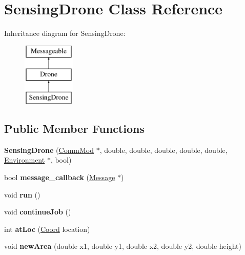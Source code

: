\hypertarget{class_sensing_drone}{}\section{Sensing\+Drone Class Reference}
\label{class_sensing_drone}
Inheritance diagram for Sensing\+Drone\+:\begin{figure}[H]
\begin{center}
\leavevmode
\includegraphics[height=3.000000cm]{class_sensing_drone}
\end{center}
\end{figure}
\subsection*{Public Member Functions}
\begin{DoxyCompactItemize}
\item 
{\bfseries Sensing\+Drone} (\hyperlink{class_comm_mod}{Comm\+Mod} $\ast$, double, double, double, double, double, \hyperlink{class_environment}{Environment} $\ast$, bool)\hypertarget{class_sensing_drone_ad9733d7b33e8e6d1cbebf0d8a8830834}{}\label{class_sensing_drone_ad9733d7b33e8e6d1cbebf0d8a8830834}

\item 
bool {\bfseries message\+\_\+callback} (\hyperlink{class_message}{Message} $\ast$)\hypertarget{class_sensing_drone_a2f4e2de60a0d37c6d6a39078df3458ba}{}\label{class_sensing_drone_a2f4e2de60a0d37c6d6a39078df3458ba}

\item 
void {\bfseries run} ()\hypertarget{class_sensing_drone_a84dd9d47273b8c4c05853b15547be6a2}{}\label{class_sensing_drone_a84dd9d47273b8c4c05853b15547be6a2}

\item 
void {\bfseries continue\+Job} ()\hypertarget{class_sensing_drone_a357bfe8d14cba7c52f8817ebf3350102}{}\label{class_sensing_drone_a357bfe8d14cba7c52f8817ebf3350102}

\item 
int {\bfseries at\+Loc} (\hyperlink{struct_coord}{Coord} location)\hypertarget{class_sensing_drone_ae1d4713f47df84336a51c78b171a0d68}{}\label{class_sensing_drone_ae1d4713f47df84336a51c78b171a0d68}

\item 
void {\bfseries new\+Area} (double x1, double y1, double x2, double y2, double height)\hypertarget{class_sensing_drone_ad46ca36b37a3e8139f6ad7f1c2f4bcfe}{}\label{class_sensing_drone_ad46ca36b37a3e8139f6ad7f1c2f4bcfe}

\end{DoxyCompactItemize}

